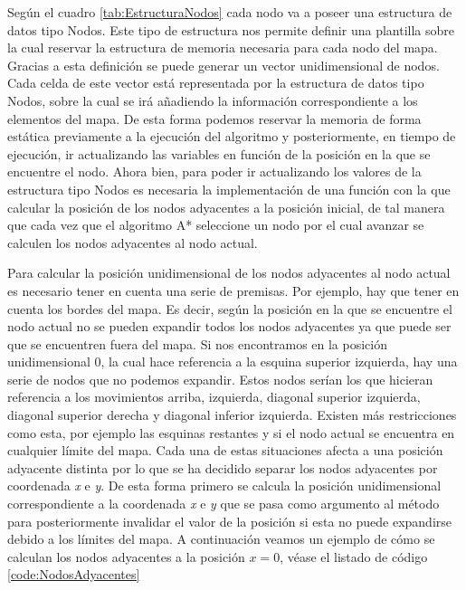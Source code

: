 Según el cuadro \ref{tab:EstructuraNodos} cada nodo va a poseer una estructura de datos tipo Nodos. Este tipo de estructura nos permite definir una plantilla sobre la cual reservar la estructura de memoria necesaria para cada nodo del mapa. Gracias a esta definición se puede generar un vector unidimensional de nodos. Cada celda de este vector está representada por la estructura de datos tipo Nodos, sobre la cual se irá añadiendo la información correspondiente a los elementos del mapa. De esta forma podemos reservar la memoria de forma estática previamente a la ejecución del algoritmo y posteriormente, en tiempo de ejecución, ir actualizando las variables en función de la posición en la que se encuentre el nodo. Ahora bien, para poder ir actualizando los valores de la estructura tipo Nodos es necesaria la implementación de una función con la que calcular la posición de los nodos adyacentes a la posición inicial, de tal manera que cada vez que el algoritmo A* seleccione un nodo por el cual avanzar se calculen los nodos adyacentes al nodo actual.

Para calcular la posición unidimensional de los nodos adyacentes al nodo actual es necesario tener en cuenta una serie de premisas. Por ejemplo, hay que tener en cuenta los bordes del mapa. Es decir, según la posición en la que se encuentre el nodo actual no se pueden expandir todos los nodos adyacentes ya que puede ser que se encuentren fuera del mapa. Si nos encontramos en la posición unidimensional 0, la cual hace referencia a la esquina superior izquierda, hay una serie de nodos que no podemos expandir. Estos nodos serían los que hicieran referencia a los movimientos arriba, izquierda, diagonal superior izquierda, diagonal superior derecha y diagonal inferior izquierda. Existen más restricciones como esta, por ejemplo las esquinas restantes y si el nodo actual se encuentra en cualquier límite del mapa. Cada una de estas situaciones afecta a una posición adyacente distinta por lo que se ha decidido separar los nodos adyacentes por coordenada \emph{x} e \emph{y}. De esta forma primero se calcula la posición unidimensional correspondiente a la coordenada \emph{x} e \emph{y} que se pasa como argumento al método para posteriormente invalidar el valor de la posición si esta no puede expandirse debido a los límites del mapa. A continuación veamos un ejemplo de cómo se calculan los nodos adyacentes a la posición $x=0$, véase el listado de código \ref{code:NodosAdyacentes}

